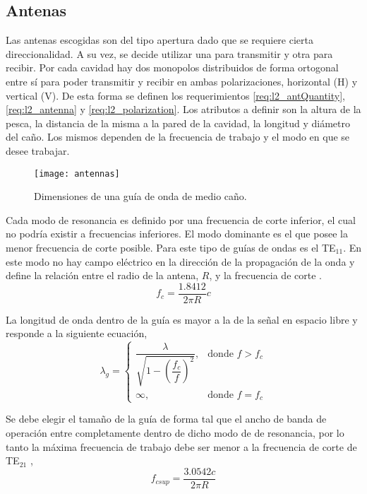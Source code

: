 \subsection{Antenas}

Las antenas escogidas son del tipo apertura dado que se requiere cierta direccionalidad. A su vez, se decide utilizar una para transmitir y otra para recibir. Por cada cavidad hay dos monopolos distribuidos de forma ortogonal entre sí para poder transmitir y recibir en ambas polarizaciones, horizontal (H) y vertical (V). De esta forma se definen los requerimientos \ref{req:l2_antQuantity}, \ref{req:l2_antenna} y \ref{req:l2_polarization}. Los atributos a definir son la altura de la pesca, la distancia de la misma a la pared de la cavidad, la longitud y diámetro del caño. Los mismos dependen de la frecuencia de trabajo y el modo en que se desee trabajar.

\begin{figure}
 \centering
 \texttt{[image: antennas]}
 \caption{Dimensiones de una guía de onda de medio caño.}
 \label{fig:antennas}
\end{figure}

Cada modo de resonancia es definido por una frecuencia de corte inferior, el cual no podría existir a frecuencias inferiores. El modo dominante es el que posee la menor frecuencia de corte posible. Para este tipo de guías de ondas es el TE$_{11}$. En este modo no hay campo eléctrico en la dirección de la propagación de la onda y define la relación entre el radio de la antena, $R$, y la frecuencia de corte \cite{circularWaveguides}.
\begin{equation} \label{eq:freqInf}
  f_c = \dfrac{\num{1.8412}}{2\pi R} c
\end{equation}

La longitud de onda dentro de la guía es mayor a la de la señal en espacio libre y responde a la siguiente ecuación,
\begin{equation} \label{eq:lambdaInGuide}
\lambda_g = \begin{cases} \dfrac{\lambda}{\sqrt{1 - (\dfrac{f_c}{f})^2}}, & \mbox{donde } f > f_c \\ \infty, & \mbox{donde } f = f_c \end{cases}
\end{equation}

Se debe elegir el tamaño de la guía de forma tal que el ancho de banda de operación entre completamente dentro de dicho modo de de resonancia, por lo tanto la máxima frecuencia de trabajo debe ser menor a la frecuencia de corte de TE$_{21}$ \cite{circularWaveguides},
\begin{equation} \label{eq:freqSup}
  f_{csup} = \dfrac{\num{3.0542}c}{2\pi R}
\end{equation}

